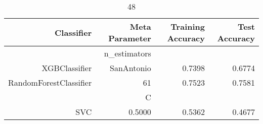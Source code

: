 
\begin{table}[H]
    \caption{48}
    \centering
    \begin{tabular}{|r|r|r|r|}
        \hline
        Classifier &Meta Parameter &Training Accuracy
        &Test Accuracy\\
        \hline
        &n\_estimators &\multicolumn{2}{|r|}{}\\
        \hline
        XGBClassifier &SanAntonio &0.7398 &0.6774\\
        \hline
        RandomForestClassifier &61 &0.7523 &0.7581\\
        \hline
        &C &\multicolumn{2}{|r|}{}\\
        \hline
        SVC &0.5000 &0.5362 &0.4677\\
        \hline
    \end{tabular}
\end{table}
